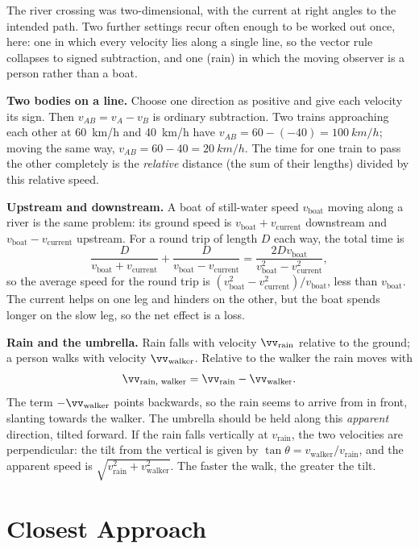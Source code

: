 The river crossing was two-dimensional, with the current at right angles to the intended path. Two
further settings recur often enough to be worked out once, here: one in which every velocity lies along
a single line, so the vector rule collapses to signed subtraction, and one (rain) in which the moving
observer is a person rather than a boat.

\textbf{Two bodies on a line.} Choose one direction as positive and give each velocity its sign. Then
$v_{AB}=v_A-v_B$ is ordinary subtraction. Two trains approaching each other at \SI{60}{km/h} and
\SI{40}{km/h} have $v_{AB}=60-(-40)=\SI{100}{km/h}$; moving the same way, $v_{AB}=60-40=\SI{20}{km/h}$.
The time for one train to pass the other completely is the \emph{relative} distance (the sum of their
lengths) divided by this relative speed.

\textbf{Upstream and downstream.} A boat of still-water speed $v_{\text{boat}}$ moving along a river is the
same problem: its ground speed is $v_{\text{boat}}+v_{\text{current}}$ downstream and
$v_{\text{boat}}-v_{\text{current}}$ upstream. For a round trip of length $D$ each way, the total time is
\[
\frac{D}{v_{\text{boat}}+v_{\text{current}}}+\frac{D}{v_{\text{boat}}-v_{\text{current}}}
=\frac{2Dv_{\text{boat}}}{v_{\text{boat}}^2-v_{\text{current}}^2},
\]
so the average speed for the round trip is $(v_{\text{boat}}^2-v_{\text{current}}^2)/v_{\text{boat}}$,
less than $v_{\text{boat}}$. The current helps on one leg and hinders on the other, but the boat spends
longer on the slow leg, so the net effect is a loss.

\textbf{Rain and the umbrella.} Rain falls with velocity $\vv_{\text{rain}}$ relative to the ground; a person
walks with velocity $\vv_{\text{walker}}$. Relative to the walker the rain moves with
\[
\vv_{\text{rain, walker}}=\vv_{\text{rain}}-\vv_{\text{walker}}.
\]
The term $-\vv_{\text{walker}}$ points backwards, so the rain seems to arrive from in front, slanting
towards the walker. The umbrella should be held along this \emph{apparent} direction, tilted forward. If the
rain falls vertically at $v_{\text{rain}}$, the two velocities are perpendicular: the tilt from the
vertical is given by $\tan\theta=v_{\text{walker}}/v_{\text{rain}}$, and the apparent speed is
$\sqrt{v_{\text{rain}}^2+v_{\text{walker}}^2}$. The faster the walk, the greater the tilt.

\section{Closest Approach}\label{sec:closest}

